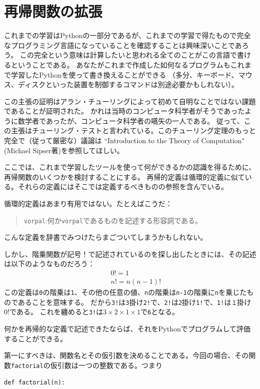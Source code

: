 \documentclass[a4j,12pt,makeidx]{jbook}
\begin{document}
\section{再帰関数の拡張}
これまでの学習はPythonの一部分であるが、これまでの学習で得たもので完全なプログラミング言語になっていることを確認することは興味深いことであろう。
この完全という意味は計算したいと思われる全てのことがこの言語で書けるということである。
あなたがこれまで作成した如何なるプログラムもこれまで学習したPythonを使って書き換えることができる
（多分、キーボード、マウス、ディスクといった装置を制御するコマンドは別途必要かもしれない）。\par
この主張の証明はアラン・チューリングによって初めて自明なことではない課題であることが証明された。
かれは当時のコンピュータ科学者がそうであったように数学者であったが、コンピュータ科学者の嚆矢の一人である。
従って、この主張はチューリング・テストと言われている。このチューリング定理のもっと完全で（従って厳密な）議論は
``Introduction to the Theory of Computation"(Michael Sipser著)を参照してほしい。 \par
ここでは、これまで学習したツールを使って何ができるかの認識を得るために、再帰関数のいくつかを検討することにする。
再帰的定義は循環的定義に似ている。それらの定義にはそこでは定義するべきものの参照を含んでいる。\par
循環的定義はあまり有用ではない。たとえばこうだ：\par
\begin{quote}
{\tt vorpal}:何か{\tt vorpal}であるものを記述する形容詞である。
\end{quote}
こんな定義を辞書でみつけたらまごついてしまうかもしれない。\par
しかし、階乗関数が記号！で記述されているのを探し出したときには、その記述は以下のようなものだろう：
\begin{eqnarray*}
&&  0! = 1 \\
&&  n! = n (n-1)!
\end{eqnarray*}
この定義は{\tt 0}の階乗は{\tt 1}、その他の任意の値、{\tt n}の階乗は{\tt n-1}の階乗に{\tt n}を乗じたものであることを意味する。
だから{\tt 3!}は{\tt 3}掛け{\tt 2!}で、{\tt 2!}は{\tt 2}掛け{\tt 1!}で、{\tt 1!}は{\tt １}掛け0!である。
これを纏めると{\tt 3!}は$3\times 2\times 1\times 1$で{\tt 6}となる。\par
何かを再帰的な定義で記述できたならば、それをPythonでプログラムして評価することができる。\par
第一にすべきは、関数名とその仮引数を決めることである。今回の場合、その関数{\tt factorial}の仮引数は一つの整数である。つまり
\begin{verbatim}
def factorial(n):
\end{verbatim}
\end{document}
